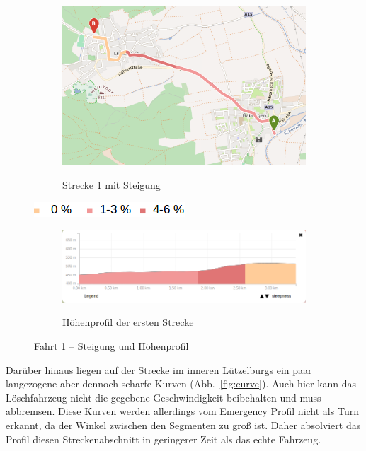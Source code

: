 \begin{figure}[h]
\centering
\begin{subfigure}{0.80\textwidth}
\centering
\includegraphics[width = \textwidth]{../media/Fahrt1_Steep.png} \\
\caption{Strecke 1 mit Steigung}
\label{fig:steig}
\end{subfigure}

\includegraphics[width =0.25 \textwidth]{../media/legend2.png} \\

\begin{subfigure}{ \textwidth}
\centering
\includegraphics[width = \textwidth]{../media/Fahrt1_Profile.png} \\
\caption{Höhenprofil der ersten Strecke}
\label{profile}
\end{subfigure}
\caption{Fahrt 1 -- Steigung und Höhenprofil}
\label{steig}
\end{figure}

Darüber hinaus liegen auf der Strecke im inneren Lützelburgs ein paar langezogene aber dennoch scharfe Kurven (Abb.~\ref{fig:curve}).
Auch hier kann das Löschfahrzeug nicht die gegebene Geschwindigkeit beibehalten und muss abbremsen.
Diese Kurven werden allerdings vom Emergency Profil nicht als Turn erkannt, da der Winkel zwischen den Segmenten zu groß ist.
Daher absolviert das Profil diesen Streckenabschnitt in geringerer Zeit als das echte Fahrzeug.

